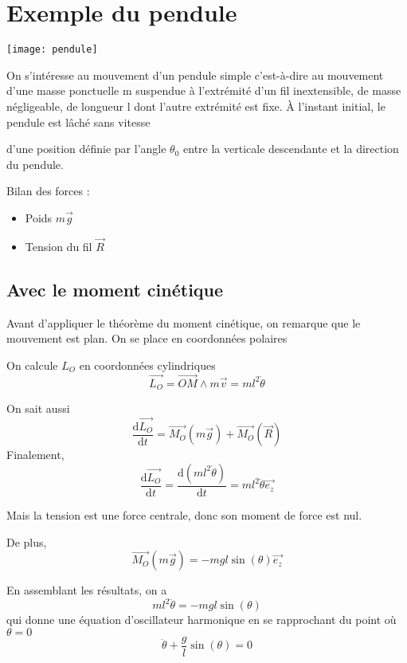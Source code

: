 \documentclass[french]{yLectureNote}
\renewcommand{\vec}{\overrightarrow}
\newcommand{\dd}{\mathrm{d}}
\begin{document}
\section{Exemple du pendule}
\texttt{[image: pendule]}

On s’intéresse au mouvement d’un pendule simple c’est-à-dire au mouvement d’une
masse ponctuelle m suspendue à l’extrémité d’un fil inextensible, de masse négligeable,
de longueur l dont l’autre extrémité est fixe.
À l’instant initial, le pendule est lâché sans vitesse

d'une position définie par l’angle $\theta_0$ entre la verticale
 descendante et la direction du pendule.

Bilan des forces :
\begin{itemize}
 \item Poids \(m\vec{g}\)
 \item Tension du fil \(\vec{R}\)
\end{itemize}
\subsection{Avec le moment cinétique}
 Avant d’appliquer le théorème du moment cinétique, on remarque que le mouvement est plan. On se place en coordonnées polaires

On calcule \(L_O\) en coordonnées cylindriques
\[ \vec{L_O} = \vec{OM} \wedge m \vec{v} = ml^2\dot{\theta} \]

On sait aussi \[\frac{\dd \vec{L_O}}{\dd t} = \vec{M_O}(m\vec{g}) + \vec{M_O}(\vec{R})\]
 Finalement, \[\frac{\dd \vec{L_O}}{\dd t} = \frac{\dd(ml^2\dot{\theta})}{\dd t} = ml^2\ddot{\theta}\vec{e_z}\]

 Mais la tension est une force centrale, donc son moment de force est nul.

 De plus, \[\vec{M_O}(m\vec{g}) = -mgl\sin(\theta)\vec{e_z} \]

 En assemblant les résultats, on a \[
 ml^2\ddot{\theta} = -mgl\sin(\theta)\]
 qui donne une équation d'oscillateur harmonique en se rapprochant du point où \(\theta = 0\) \[\ddot{\theta} + \frac{g}{l}\sin(\theta) = 0\]
\end{document}
